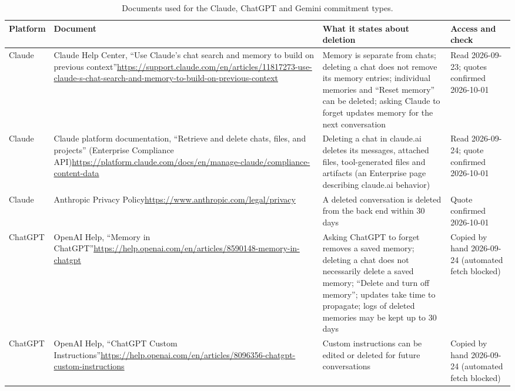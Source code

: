 \documentclass[conference,compsoc]{IEEEtran}
\begin{document}
\begin{table}[t]
\centering
\caption{Documents used for the Claude, ChatGPT and Gemini commitment types.}
\label{tab:sources-a}
\footnotesize
\setlength{\tabcolsep}{3pt}
\begin{tabular}{@{}p{}p{}p{}p{}@{}}
\toprule
Platform & Document & What it states about deletion & Access and check \\
\midrule
Claude & Claude Help Center, ``Use Claude's chat search and memory to build on previous context''\newline\url{https://support.claude.com/en/articles/11817273-use-claude-s-chat-search-and-memory-to-build-on-previous-context} & Memory is separate from chats; deleting a chat does not remove its memory entries; individual memories and ``Reset memory'' can be deleted; asking Claude to forget updates memory for the next conversation & Read 2026-09-23; quotes confirmed 2026-10-01 \\
Claude & Claude platform documentation, ``Retrieve and delete chats, files, and projects'' (Enterprise Compliance API)\newline\url{https://platform.claude.com/docs/en/manage-claude/compliance-content-data} & Deleting a chat in claude.ai deletes its messages, attached files, tool-generated files and artifacts (an Enterprise page describing claude.ai behavior) & Read 2026-09-24; quote confirmed 2026-10-01 \\
Claude & Anthropic Privacy Policy\newline\url{https://www.anthropic.com/legal/privacy} & A deleted conversation is deleted from the back end within 30 days & Quote confirmed 2026-10-01 \\
ChatGPT & OpenAI Help, ``Memory in ChatGPT''\newline\url{https://help.openai.com/en/articles/8590148-memory-in-chatgpt} & Asking ChatGPT to forget removes a saved memory; deleting a chat does not necessarily delete a saved memory; ``Delete and turn off memory''; updates take time to propagate; logs of deleted memories may be kept up to 30 days & Copied by hand 2026-09-24 (automated fetch blocked) \\
ChatGPT & OpenAI Help, ``ChatGPT Custom Instructions''\newline\url{https://help.openai.com/en/articles/8096356-chatgpt-custom-instructions} & Custom instructions can be edited or deleted for future conversations & Copied by hand 2026-09-24 (automated fetch blocked) \\

\end{tabular}
\end{table}
\end{document}

